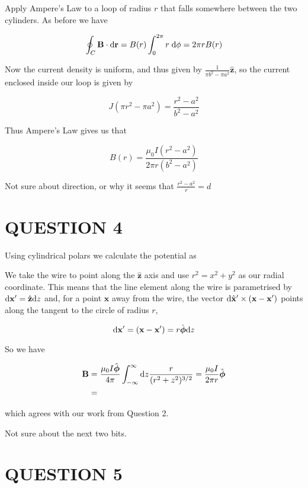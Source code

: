 \documentclass[a4paper]{article}
\begin{document}
Apply Ampere's Law to a loop of radius $ r $ that falls somewhere between the two cylinders. As before we have

\[
\oint_C \mathbf{B}\cdot \mathrm{d} \mathbf{r} = B(r)\int_0^{2\pi} r\;\mathrm{d} \phi = 2\pi r B(r)
\]

Now the current density is uniform, and thus given by $ \frac{1}{\pi b^{2} - \pi a^{2}} \hat{\mathbf{z}} $, so the current enclosed inside our loop is given by

\[ J (\pi r^{2} - \pi a^{2}) = \frac{r^{2} - a^{2}}{b^{2} - a^{2}} \]

Thus Ampere's Law gives us that

\[ B(r) = \frac{\mu_{0} I (r^{2} - a^{2})}{2 \pi r (b^{2} - a^{2})} \]


Not sure about direction, or why it seems that $ \frac{r^{2} - a^{2}}{r} = d $


\section{QUESTION 4}


Using cylindrical polars we calculate the potential as 


We take the wire to point along the $ \hat{\mathbf{z}} $ axis and use
$ r^{2} = x^{2} + y^{2} $ as our radial coordinate. This means that the line
element along the wire is parametrised by $ \mathrm{d} \mathbf{x}' = \hat{\mathbf{z}} \mathrm{d} z  $ and, for a point $ \mathbf{x}  $ away from the wire, the vector $ \mathrm{d} \hat{\mathbf{x}}' \times (\mathbf{x} - \mathbf{x}') $ points along the tangent to the circle of radius $ r $,


\[ \mathrm{d} \mathbf{x}' = (\mathbf{x} - \mathbf{x}') = r \hat{\boldsymbol\phi} \mathrm{d} z\]

So we have


\begin{align*}
\mathbf{B} & = \frac{\mu_{0} I  \hat{\boldsymbol\phi}}{4 \pi} \int_{-\infty}^{\infty} \mathrm{d} z \frac{ r}{(r^{2} + z^{2}  )^{3/2}} = \frac{\mu_{0} I}{2 \pi r} \hat{\boldsymbol\phi} \\
& =                       
\end{align*}              
                          
                          
which agrees with our work from Question 2.

Not sure about the next two bits.                           
                         



\section{QUESTION 5}
\end{document}
